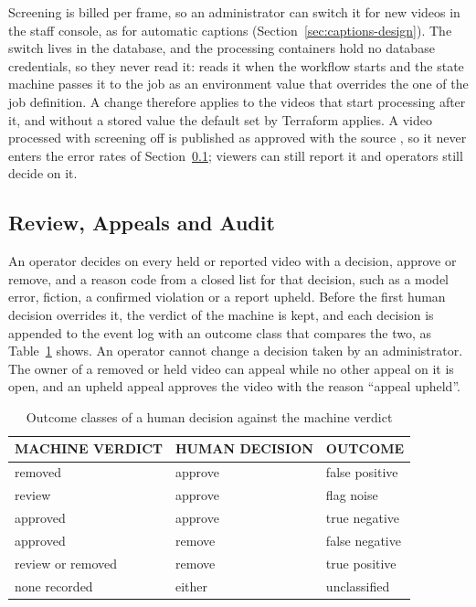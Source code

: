 Screening is billed per frame, so an administrator can switch it for new videos in the staff
console, as for automatic captions (Section~\ref{sec:captions-design}). The switch lives in the
database, and the processing containers hold no database credentials, so they never read it:
 reads it when the workflow starts and the state machine passes it to the
 job as an environment value that overrides the one of the job definition. A change
therefore applies to the videos that start processing after it, and without a stored value the
default set by Terraform applies. A video processed with screening off is published as approved
with the source , so it never enters the error rates of
Section~\ref{sec:review-design}; viewers can still report it and operators still decide on it.

\subsection{Review, Appeals and Audit}
\label{sec:review-design}

An operator decides on every held or reported video with a decision, approve or remove, and a reason
code from a closed list for that decision, such as a model error, fiction, a confirmed violation or a
report upheld. Before the first human decision overrides it, the verdict of the machine is kept, and
each decision is appended to the event log with an outcome class that compares the two, as
Table~\ref{tab:outcome-classes} shows. An operator cannot change a decision taken by an
administrator. The owner of a removed or held video can appeal while no other appeal on it is open,
and an upheld appeal approves the video with the reason ``appeal upheld''.

\begin{table}[H]
\centering
\caption{Outcome classes of a human decision against the machine verdict}
\label{tab:outcome-classes}
\small
\begin{tabular}{l l l}
\toprule
\textbf{MACHINE VERDICT} & \textbf{HUMAN DECISION} & \textbf{OUTCOME} \\
\midrule
removed & approve & false positive \\
review & approve & flag noise \\
approved & approve & true negative \\
approved & remove & false negative \\
review or removed & remove & true positive \\
none recorded & either & unclassified \\
\bottomrule
\end{tabular}
\end{table}

